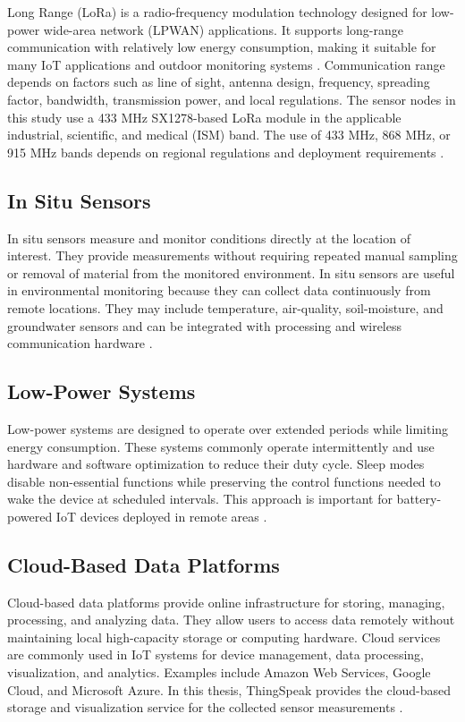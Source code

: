 Long Range (LoRa) is a radio-frequency modulation technology designed for
low-power wide-area network (LPWAN) applications. It supports long-range
communication with relatively low energy consumption, making it suitable
for many IoT applications and outdoor monitoring systems
\cite{dambal2019lora}. Communication range depends on factors such as
line of sight, antenna design, frequency, spreading factor, bandwidth,
transmission power, and local regulations. The sensor nodes in this study
use a 433 MHz SX1278-based LoRa module in the applicable industrial,
scientific, and medical (ISM) band. The use of 433 MHz, 868 MHz, or
915 MHz bands depends on regional regulations and deployment requirements
\cite{camarillo2022lorawan,yahya2023antenna}.

\subsection{In Situ Sensors}

In situ sensors measure and monitor conditions directly at the location of
interest. They provide measurements without requiring repeated manual
sampling or removal of material from the monitored environment. In situ
sensors are useful in environmental monitoring because they can collect
data continuously from remote locations. They may include temperature,
air-quality, soil-moisture, and groundwater sensors and can be integrated
with processing and wireless communication hardware
\cite{barnhart2010groundwater}.

\subsection{Low-Power Systems}

Low-power systems are designed to operate over extended periods while limiting energy consumption. These
systems commonly operate intermittently and use hardware and software
optimization to reduce their duty cycle. Sleep modes disable non-essential
functions while preserving the control functions needed to wake the device
at scheduled intervals. This approach is important for battery-powered IoT
devices deployed in remote areas \cite{skuta2020power, montoya2018sward}.

\subsection{Cloud-Based Data Platforms}

Cloud-based data platforms provide online infrastructure for storing,
managing, processing, and analyzing data. They allow users to access data
remotely without maintaining local high-capacity storage or computing
hardware. Cloud services are commonly used in IoT systems for device
management, data processing, visualization, and analytics. Examples include
Amazon Web Services, Google Cloud, and Microsoft Azure. In this thesis,
ThingSpeak provides the cloud-based storage and visualization service for
the collected sensor measurements \cite{sun2011cloud}.

